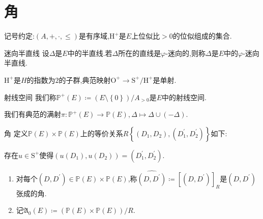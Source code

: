 \section{角}

记号约定:$\left(A,+,\cdot,\leq\right)$是有序域,$\mathrm{H}^{+}$是$E$上位似比$>0$的位似组成的集合.

\begin{definition}{迷向半直线}{}
	设$\Delta$是$E$中的半直线.若$\Delta$所在的直线是$\varphi$-迷向的,则称$\Delta$是$E$中的$\varphi$-迷向半直线.
\end{definition}

\begin{proposition}{}{}
	$\mathrm{H}^{+}$是$H$的指数为$2$的子群,典范映射$\mathrm{O}^{+}\to\mathrm{S}^{+}/\mathrm{H}^{+}$是单射.
\end{proposition}

\begin{definition}{射线空间}{}
	我们称$\mathbb{P}^{+}\left(E\right)\coloneq\left(E\setminus\left\{0\right\}\right)/A_{>0}$是$E$中的射线空间.
\end{definition}

\begin{remark}{}{}
	我们有典范的满射$\pi:\mathbb{P}^{+}\left(E\right)\to\mathbb{P}\left(E\right),\Delta\mapsto\Delta\cup\left(-\Delta\right)$.
\end{remark}

\begin{definition}{角}{}
	定义$\mathbb{P}\left(E\right)\times\mathbb{P}\left(E\right)$上的等价关系$R\left\{\left(D_{1},D_{2}\right),\left(D_{1}^{\prime},D_{2}^{\prime}\right)\right\}$如下:
	\begin{center}
		存在$u\in\mathrm{S}^{+}$使得$\left(u\left(D_{1}\right),u\left(D_{2}\right)\right)=\left(D_{1}^{\prime},D_{2}^{\prime}\right)$.
	\end{center}
	\begin{enumerate}
		\item 对每个$\left(D,D^{\prime}\right)\in\mathbb{P}\left(E\right)\times\mathbb{P}\left(E\right)$,称$\widehat{\left(D,D^{\prime}\right)}\coloneq\left[\left(D,D^{\prime}\right)\right]_{R}$是$\left(D,D^{\prime}\right)$张成的角.
		\item 记$\mathfrak{A}_{0}\left(E\right)\coloneq\left(\mathbb{P}\left(E\right)\times\mathbb{P}\left(E\right)\right)/R$.
	\end{enumerate}
\end{definition}

